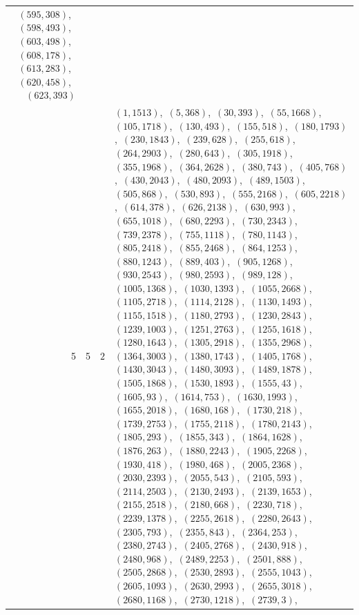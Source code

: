 \documentclass[11pt]{article}
\begin{document}
\begin{longtable}{@{}rrl>{\raggedright\arraybackslash}p{}@{}}
$(595,308)$,\allowbreak\ $(598,493)$,\allowbreak\ $(603,498)$,\allowbreak\ $(608,178)$,\allowbreak\ $(613,283)$,\allowbreak\ $(620,458)$,\allowbreak\ $(623,393)$\\
5 & 5 & $2$ & $(1,1513)$,\allowbreak\ $(5,368)$,\allowbreak\ $(30,393)$,\allowbreak\ $(55,1668)$,\allowbreak\ $(105,1718)$,\allowbreak\ $(130,493)$,\allowbreak\ $(155,518)$,\allowbreak\ $(180,1793)$,\allowbreak\ $(230,1843)$,\allowbreak\ $(239,628)$,\allowbreak\ $(255,618)$,\allowbreak\ $(264,2903)$,\allowbreak\ $(280,643)$,\allowbreak\ $(305,1918)$,\allowbreak\ $(355,1968)$,\allowbreak\ $(364,2628)$,\allowbreak\ $(380,743)$,\allowbreak\ $(405,768)$,\allowbreak\ $(430,2043)$,\allowbreak\ $(480,2093)$,\allowbreak\ $(489,1503)$,\allowbreak\ $(505,868)$,\allowbreak\ $(530,893)$,\allowbreak\ $(555,2168)$,\allowbreak\ $(605,2218)$,\allowbreak\ $(614,378)$,\allowbreak\ $(626,2138)$,\allowbreak\ $(630,993)$,\allowbreak\ $(655,1018)$,\allowbreak\ $(680,2293)$,\allowbreak\ $(730,2343)$,\allowbreak\ $(739,2378)$,\allowbreak\ $(755,1118)$,\allowbreak\ $(780,1143)$,\allowbreak\ $(805,2418)$,\allowbreak\ $(855,2468)$,\allowbreak\ $(864,1253)$,\allowbreak\ $(880,1243)$,\allowbreak\ $(889,403)$,\allowbreak\ $(905,1268)$,\allowbreak\ $(930,2543)$,\allowbreak\ $(980,2593)$,\allowbreak\ $(989,128)$,\allowbreak\ $(1005,1368)$,\allowbreak\ $(1030,1393)$,\allowbreak\ $(1055,2668)$,\allowbreak\ $(1105,2718)$,\allowbreak\ $(1114,2128)$,\allowbreak\ $(1130,1493)$,\allowbreak\ $(1155,1518)$,\allowbreak\ $(1180,2793)$,\allowbreak\ $(1230,2843)$,\allowbreak\ $(1239,1003)$,\allowbreak\ $(1251,2763)$,\allowbreak\ $(1255,1618)$,\allowbreak\ $(1280,1643)$,\allowbreak\ $(1305,2918)$,\allowbreak\ $(1355,2968)$,\allowbreak\ $(1364,3003)$,\allowbreak\ $(1380,1743)$,\allowbreak\ $(1405,1768)$,\allowbreak\ $(1430,3043)$,\allowbreak\ $(1480,3093)$,\allowbreak\ $(1489,1878)$,\allowbreak\ $(1505,1868)$,\allowbreak\ $(1530,1893)$,\allowbreak\ $(1555,43)$,\allowbreak\ $(1605,93)$,\allowbreak\ $(1614,753)$,\allowbreak\ $(1630,1993)$,\allowbreak\ $(1655,2018)$,\allowbreak\ $(1680,168)$,\allowbreak\ $(1730,218)$,\allowbreak\ $(1739,2753)$,\allowbreak\ $(1755,2118)$,\allowbreak\ $(1780,2143)$,\allowbreak\ $(1805,293)$,\allowbreak\ $(1855,343)$,\allowbreak\ $(1864,1628)$,\allowbreak\ $(1876,263)$,\allowbreak\ $(1880,2243)$,\allowbreak\ $(1905,2268)$,\allowbreak\ $(1930,418)$,\allowbreak\ $(1980,468)$,\allowbreak\ $(2005,2368)$,\allowbreak\ $(2030,2393)$,\allowbreak\ $(2055,543)$,\allowbreak\ $(2105,593)$,\allowbreak\ $(2114,2503)$,\allowbreak\ $(2130,2493)$,\allowbreak\ $(2139,1653)$,\allowbreak\ $(2155,2518)$,\allowbreak\ $(2180,668)$,\allowbreak\ $(2230,718)$,\allowbreak\ $(2239,1378)$,\allowbreak\ $(2255,2618)$,\allowbreak\ $(2280,2643)$,\allowbreak\ $(2305,793)$,\allowbreak\ $(2355,843)$,\allowbreak\ $(2364,253)$,\allowbreak\ $(2380,2743)$,\allowbreak\ $(2405,2768)$,\allowbreak\ $(2430,918)$,\allowbreak\ $(2480,968)$,\allowbreak\ $(2489,2253)$,\allowbreak\ $(2501,888)$,\allowbreak\ $(2505,2868)$,\allowbreak\ $(2530,2893)$,\allowbreak\ $(2555,1043)$,\allowbreak\ $(2605,1093)$,\allowbreak\ $(2630,2993)$,\allowbreak\ $(2655,3018)$,\allowbreak\ $(2680,1168)$,\allowbreak\ $(2730,1218)$,\allowbreak\ $(2739,3)$,\allowbreak\ 
\end{longtable}
\end{document}
